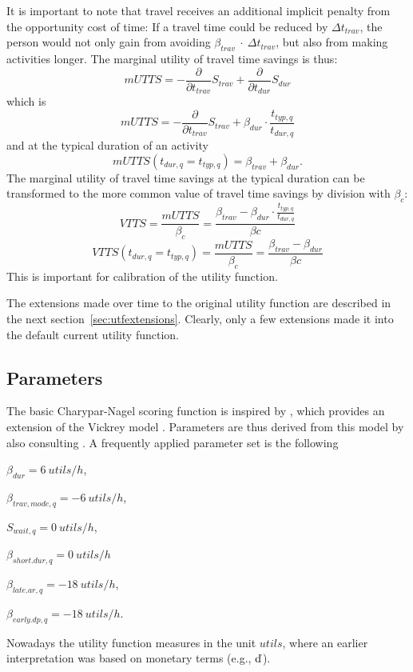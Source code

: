
It is important to note that travel receives an additional implicit penalty from the opportunity cost of time: If a travel time could be reduced by $\Delta t_{trav}$, the person would not only gain from avoiding $\beta_{trav}~\cdot~\Delta t_{trav}$, but also from making activities longer. The marginal utility of travel time savings is thus:
%
\[
mUTTS = - \frac{\partial}{\partial t_{trav}} S_{trav} + \frac{\partial}{\partial t_{dur}}S_{dur} 
\]
which is 
\begin{equation}
mUTTS = - \frac{\partial}{\partial t_{trav}} S_{trav} +  \beta_{dur} \cdot \frac{t_{typ,q}}{t_{dur,q}} 
\label{eq:mUTTSfull}
\end{equation}
and at the typical duration of an activity
\[
mUTTS(t_{dur,q} = t_{typ,q}) = \beta_{trav} + \beta_{dur}.
\]
The marginal utility of travel time savings at the typical duration can be transformed to the more common value of travel time savings by division with $\beta_{c}$:
\[
VTTS = \frac{mUTTS}{\beta_{c}} = \frac{\beta_{trav} - \beta_{dur} \cdot \frac{t_{typ,q}}{t_{dur,q}} }{\beta{c}}
\]
\[
VTTS(t_{dur,q} = t_{typ,q}) = \frac{mUTTS}{\beta_{c}} = \frac{\beta_{trav} - \beta_{dur}}{\beta{c}}
\]
This is important for calibration of the utility function.

The extensions made over time to the original utility function are described in the next section~\ref{sec:utfextensions}. Clearly, only a few extensions made it into the default current utility function. 

\subsection{Parameters}
\label{sec:paramset}
The basic Charypar-Nagel scoring function is inspired by \citet[][]{ArnottEtAl_TAER_1993}, which provides an extension of the Vickrey model \citep[][]{Vickrey_TAER_1969}. Parameters are thus derived from this model by also consulting \citet[][]{ChaumetEtAl_2006}. A frequently applied parameter set is the following 
%
\begin{compactitem}
\item $\beta_{dur}= 6\ utils/h$,
\item $\beta_{trav, mode, q}= -6\ utils/h$,
\item $S_{wait,q}=0\ utils/h$,
\item $\beta_{short.dur,q} = 0\ utils/h$
\item $\beta_{late.ar,q}=-18\ utils/h$,
\item $\beta_{early.dp,q}=-18\ utils/h$.
\end{compactitem}
%
Nowadays the utility function measures in the unit $utils$, where an earlier interpretation was based on monetary terms (e.g., $\EUR$).

